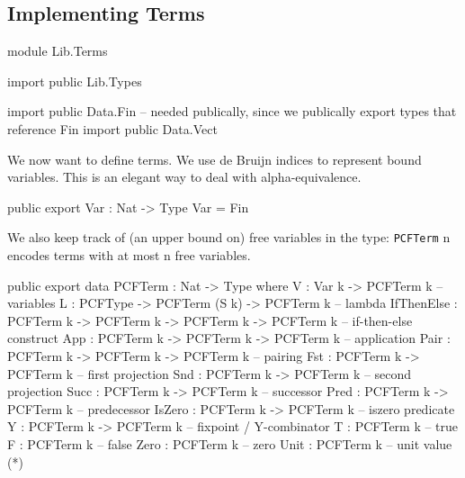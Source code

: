 \subsection{Implementing Terms}

\begin{hidden}
module Lib.Terms

import public Lib.Types

import public Data.Fin  -- needed publically, since we publically export types that reference Fin
import public Data.Vect

\end{hidden}

We now want to define terms. We use de Bruijn indices to represent bound variables.
This is an elegant way to deal with alpha-equivalence.

\begin{code}
public export
Var : Nat -> Type
Var = Fin
\end{code}

We also keep track of (an upper bound on) free variables in the type:
\lstinline{PCFTerm} n encodes terms with at most n free variables.

\begin{code}
public export
data PCFTerm : Nat -> Type where
  V          : Var k -> PCFTerm k                                -- variables
  L          : PCFType -> PCFTerm (S k) -> PCFTerm k             -- lambda
  IfThenElse : PCFTerm k -> PCFTerm k -> PCFTerm k -> PCFTerm k  -- if-then-else construct
  App        : PCFTerm k -> PCFTerm k -> PCFTerm k               -- application
  Pair       : PCFTerm k -> PCFTerm k -> PCFTerm k               -- pairing
  Fst        : PCFTerm k -> PCFTerm k                            -- first projection
  Snd        : PCFTerm k -> PCFTerm k                            -- second projection
  Succ       : PCFTerm k -> PCFTerm k                            -- successor
  Pred       : PCFTerm k -> PCFTerm k                            -- predecessor
  IsZero     : PCFTerm k -> PCFTerm k                            -- iszero predicate
  Y          : PCFTerm k -> PCFTerm k                            -- fixpoint / Y-combinator
  T          : PCFTerm k                                         -- true
  F          : PCFTerm k                                         -- false
  Zero       : PCFTerm k                                         -- zero
  Unit       : PCFTerm k                                         -- unit value (*)
\end{code}

